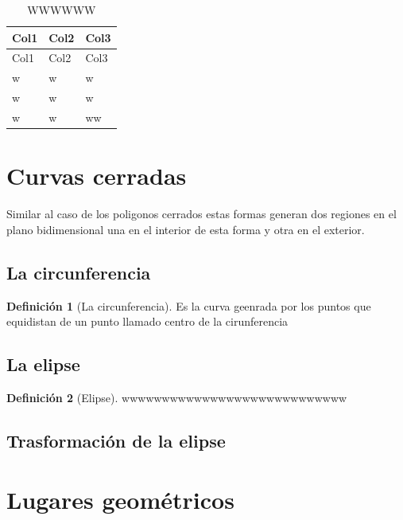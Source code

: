 \documentclass[
  16pt,
]{krantz}
\theoremstyle{definition}
\newtheorem{definition}{Definición}[chapter]
\theoremstyle{definition}
\theoremstyle{definition}
\theoremstyle{definition}
\theoremstyle{remark}
\begin{document}
\begin{longtable}[]{@{}lll@{}}
\caption{\label{tab:regular} WWWWWW}\tabularnewline
\toprule
Col1 & Col2 & Col3 \\
\midrule
\endfirsthead
\toprule
Col1 & Col2 & Col3 \\
\midrule
\endhead
w & w & w \\
w & w & w \\
w & w & ww \\
\bottomrule
\end{longtable}

\hypertarget{curvas-cerradas}{%
\section{Curvas cerradas}\label{curvas-cerradas}}

Similar al caso de los poligonos cerrados estas formas generan dos regiones en el plano bidimensional una en el interior de esta forma y otra en el exterior.

\hypertarget{la-circunferencia}{%
\subsection{La circunferencia}\label{la-circunferencia}}

\begin{definition}[La circunferencia]
\protect\hypertarget{def:circulo}{}{\label{def:circulo} {} }Es la curva geenrada por los puntos que equidistan de un punto llamado centro de la cirunferencia
\end{definition}

\hypertarget{la-elipse}{%
\subsection{La elipse}\label{la-elipse}}

\begin{definition}[Elipse]
\protect\hypertarget{def:elipse}{}{\label{def:elipse} {} }wwwwwwwwwwwwwwwwwwwwwwwwwwww
\end{definition}

\hypertarget{trasformaciuxf3n-de-la-elipse}{%
\subsection{Trasformación de la elipse}\label{trasformaciuxf3n-de-la-elipse}}

\hypertarget{lugares-geomuxe9tricos}{%
\section{Lugares geométricos}\label{lugares-geomuxe9tricos}}
\end{document}
